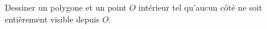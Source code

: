 Dessiner un polygone et un point $O$ intérieur tel qu'aucun côté ne soit entièrement visible depuis $O$.
